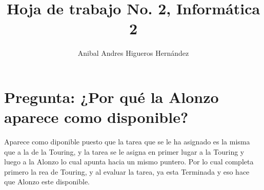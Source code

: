 \documentclass{article}
\begin{document}
        \title{Hoja de trabajo No. 2, Informática 2}
        \author{Anibal Andres Higueros Hernández}
        \maketitle
        
        \section{Pregunta: ¿Por qué la Alonzo aparece como disponible?}
        
        Aparece como diponible  puesto que la tarea que se le ha asignado es la misma que a la de la Touring, y la tarea se le asigna en primer lugar a la Touring y luego a la Alonzo lo cual apunta hacia un mismo puntero. Por lo cual completa primero la rea de Touring, y al evaluar la tarea, ya esta Terminada y eso hace que Alonzo este disponible.

    
\end{document}
